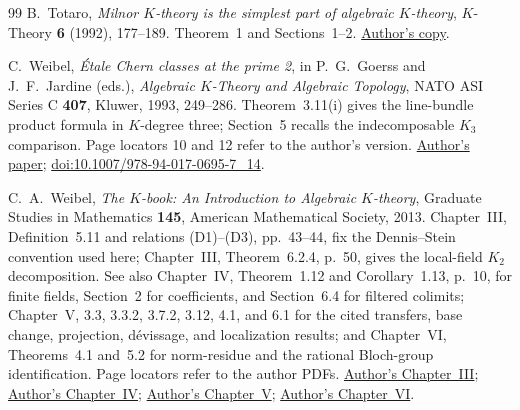\documentclass[11pt,a4paper]{amsart}
\numberwithin{equation}{section}
\theoremstyle{definition}
\theoremstyle{remark}
\begin{document}
\begin{thebibliography}{99}
B.~Totaro, \emph{Milnor $K$-theory is the simplest part of algebraic
$K$-theory}, $K$-Theory \textbf{6} (1992), 177--189.
Theorem~1 and Sections~1--2.
\href{https://www.math.ucla.edu/~totaro/papers/public_html/milnor.pdf}
{Author's copy}.

C.~Weibel, \emph{\'Etale Chern classes at the prime 2},
in P.~G.~Goerss and J.~F.~Jardine (eds.),
\emph{Algebraic $K$-Theory and Algebraic Topology},
NATO ASI Series C \textbf{407}, Kluwer, 1993, 249--286.
Theorem~3.11(i) gives the line-bundle product formula in $K$-degree three;
Section~5 recalls the indecomposable $K_3$ comparison.
Page locators 10 and 12 refer to the author's version.
\href{https://sites.math.rutgers.edu/~weibel/archive/papers-dir/chernclass.pdf}{Author's paper};
\href{https://doi.org/10.1007/978-94-017-0695-7_14}{doi:10.1007/978-94-017-0695-7\_14}.

C.~A.~Weibel, \emph{The $K$-book: An Introduction to Algebraic $K$-theory}, Graduate Studies in Mathematics \textbf{145}, American Mathematical Society, 2013.
Chapter~III, Definition~5.11 and relations (D1)--(D3), pp.~43--44,
fix the Dennis--Stein convention used here; Chapter~III,
Theorem~6.2.4, p.~50, gives the local-field $K_2$ decomposition.
See also Chapter~IV, Theorem~1.12 and Corollary~1.13, p.~10,
for finite fields, Section~2 for coefficients, and Section~6.4
for filtered colimits; Chapter~V, 3.3, 3.3.2, 3.7.2, 3.12,
4.1, and 6.1 for the cited transfers, base change, projection,
d\'evissage, and localization results; and Chapter~VI,
Theorems~4.1 and~5.2 for norm-residue and the rational
Bloch-group identification. Page locators refer to the author PDFs.
\href{https://sites.math.rutgers.edu/~weibel/Kbook/Kbook.III.pdf}{Author's Chapter~III};
\href{https://sites.math.rutgers.edu/~weibel/Kbook/Kbook.IV.pdf}{Author's Chapter~IV};
\href{https://sites.math.rutgers.edu/~weibel/Kbook/Kbook.V.pdf}{Author's Chapter~V};
\href{https://sites.math.rutgers.edu/~weibel/Kbook/Kbook.VI.pdf}{Author's Chapter~VI}.
\end{thebibliography}

\end{document}
